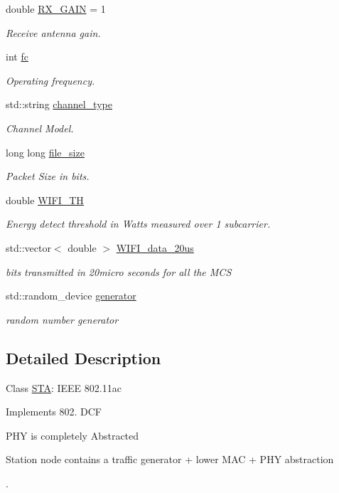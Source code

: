 \begin{DoxyCompactItemize}
double \hyperlink{classSTA_a4486a94dba2121db6931da1fb650dc19}{R\-X\-\_\-\-G\-A\-I\-N} = 1
\begin{DoxyCompactList}\small\item\em Receive antenna gain. \end{DoxyCompactList}\item 
int \hyperlink{classSTA_a07c54eac4b0f34790e0a2e4dcbe720ac}{fc}
\begin{DoxyCompactList}\small\item\em Operating frequency. \end{DoxyCompactList}\item 
std\-::string \hyperlink{classSTA_a5d1a873bdd6733103441abadf4db1475}{channel\-\_\-type}
\begin{DoxyCompactList}\small\item\em Channel Model. \end{DoxyCompactList}\item 
long long \hyperlink{classSTA_acdf811c6a31773fa3d64ef07efa8941d}{file\-\_\-size}
\begin{DoxyCompactList}\small\item\em Packet Size in bits. \end{DoxyCompactList}\item 
double \hyperlink{classSTA_a4cf7f03951b6bf6263b55c5ff4f28f4c}{W\-I\-F\-I\-\_\-\-T\-H}
\begin{DoxyCompactList}\small\item\em Energy detect threshold in Watts measured over 1 subcarrier. \end{DoxyCompactList}\item 
std\-::vector$<$ double $>$ \hyperlink{classSTA_a97c786822c28334e2a1d351ae5fe9d52}{W\-I\-F\-I\-\_\-data\-\_\-20us}
\begin{DoxyCompactList}\small\item\em bits transmitted in 20micro seconds for all the M\-C\-S \end{DoxyCompactList}\item 
std\-::random\-\_\-device \hyperlink{classSTA_a6abca7e07713d8123e843efea3c87cd1}{generator}
\begin{DoxyCompactList}\small\item\em random number generator \end{DoxyCompactList}\end{DoxyCompactItemize}


\subsection{Detailed Description}
Class \hyperlink{classSTA}{S\-T\-A}\-: I\-E\-E\-E 802.\-11ac \par
Implements 802. D\-C\-F \par
P\-H\-Y is completely Abstracted \par
Station node contains a traffic generator + lower M\-A\-C + P\-H\-Y abstraction \par
. 


